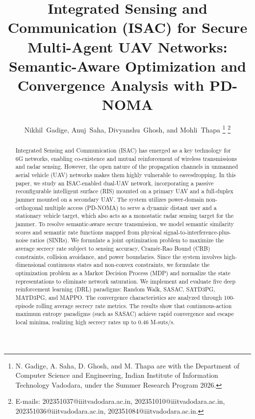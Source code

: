 \documentclass[journal,onecolumn]{IEEEtran}
\begin{document}
\title{Integrated Sensing and Communication (ISAC) for Secure Multi-Agent UAV Networks: Semantic-Aware Optimization and Convergence Analysis with PD-NOMA}

\author{
Nikhil~Gadige,
Anuj~Saha,
Divyanshu~Ghosh,
and Mohli~Thapa%
\thanks{N. Gadige, A. Saha, D. Ghosh, and M. Thapa are with the Department of Computer Science and Engineering, Indian Institute of Information Technology Vadodara, under the Summer Research Program 2026.}%
\thanks{E-mails: 202351037@iiitvadodara.ac.in, 202351010@iiitvadodara.ac.in, 202351036@iiitvadodara.ac.in, 202351084@iiitvadodara.ac.in.}
}

\maketitle

\begin{abstract}
Integrated Sensing and Communication (ISAC) has emerged as a key technology for 6G networks, enabling co-existence and mutual reinforcement of wireless transmissions and radar sensing. However, the open nature of the propagation channels in unmanned aerial vehicle (UAV) networks makes them highly vulnerable to eavesdropping. In this paper, we study an ISAC-enabled dual-UAV network, incorporating a passive reconfigurable intelligent surface (RIS) mounted on a primary UAV and a full-duplex jammer mounted on a secondary UAV. The system utilizes power-domain non-orthogonal multiple access (PD-NOMA) to serve a dynamic distant user and a stationary vehicle target, which also acts as a monostatic radar sensing target for the jammer. To resolve semantic-aware secure transmission, we model semantic similarity scores and semantic rate functions mapped from physical signal-to-interference-plus-noise ratios (SINRs). We formulate a joint optimization problem to maximize the average secrecy rate subject to sensing accuracy, Cram\'{e}r-Rao Bound (CRB) constraints, collision avoidance, and power boundaries. Since the system involves high-dimensional continuous states and non-convex constraints, we formulate the optimization problem as a Markov Decision Process (MDP) and normalize the state representations to eliminate network saturation. We implement and evaluate five deep reinforcement learning (DRL) paradigms: Random Walk, SASAC, SATD3PG, MATD3PG, and MAPPO. The convergence characteristics are analyzed through 100-episode rolling average secrecy rate metrics. The results show that continuous-action maximum entropy paradigms (such as SASAC) achieve rapid convergence and escape local minima, realizing high secrecy rates up to 0.46 M-suts/s.
\end{abstract}
\end{document}
